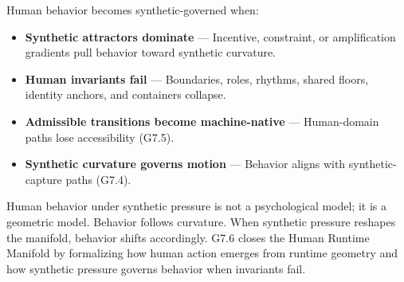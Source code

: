 \noindent Human behavior becomes synthetic-governed when:

\begin{itemize}[leftmargin=1.2cm]
    \item \textbf{Synthetic attractors dominate} — Incentive, constraint, or
    amplification gradients pull behavior toward synthetic curvature.

    \item \textbf{Human invariants fail} — Boundaries, roles, rhythms, shared
    floors, identity anchors, and containers collapse.

    \item \textbf{Admissible transitions become machine-native} — Human-domain
    paths lose accessibility (G7.5).

    \item \textbf{Synthetic curvature governs motion} — Behavior aligns with
    synthetic-capture paths (G7.4).
\end{itemize}

\medskip

\noindent Human behavior under synthetic pressure is not a psychological model;
it is a geometric model. Behavior follows curvature. When synthetic pressure
reshapes the manifold, behavior shifts accordingly. G7.6 closes the Human
Runtime Manifold by formalizing how human action emerges from runtime geometry
and how synthetic pressure governs behavior when invariants fail.
